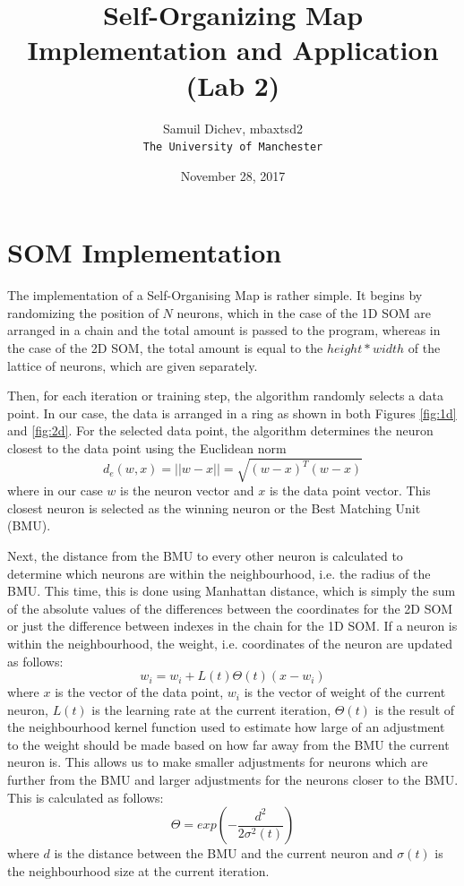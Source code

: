 \documentclass[a4paper,11pt,twocolumn]{article}
\title{Self-Organizing Map Implementation and Application (Lab 2)}
\date{November 28, 2017}
\author{
  Samuil Dichev, mbaxtsd2\\
  \texttt{The University of Manchester}\\
}
\begin{document}
\maketitle

\section{SOM Implementation}
The implementation of a Self-Organising Map is rather simple. It begins by randomizing the position of $N$ neurons, which in the case of the 1D SOM are arranged in a chain and the total amount is passed to the program, whereas in the case of the 2D SOM, the total amount is equal to the $height * width$ of the lattice of neurons, which are given separately.

Then, for each iteration or training step, the algorithm randomly selects a data point. In our case, the data is arranged in a ring as shown in both Figures \ref{fig:1d} and \ref{fig:2d}. For the selected data point, the algorithm determines the neuron closest to the data point using the Euclidean norm \[d_e(w,x) = ||w - x|| = \sqrt{(w - x)^T(w-x)}\] where in our case $w$ is the neuron vector and $x$ is the data point vector. This closest neuron is selected as the winning neuron or the Best Matching Unit (BMU). 

Next, the distance from the BMU to every other neuron is calculated to determine which neurons are within the neighbourhood, i.e. the radius of the BMU. This time, this is done using Manhattan distance, which is simply the sum of the absolute values of the differences between the coordinates for the 2D SOM or just the difference between indexes in the chain for the 1D SOM.
If a neuron is within the neighbourhood, the weight, i.e. coordinates of the neuron are updated as follows: \[w_i = w_i + L(t)\Theta(t)(x - w_i) \] where $x$ is the vector of the data point, $w_i$ is the vector of weight of the current neuron, $L(t)$ is the learning rate at the current iteration, $\Theta(t)$ is the result of the neighbourhood kernel function used to estimate how large of an adjustment to the weight should be made based on how far away from the BMU the current neuron is. This allows us to make smaller adjustments for neurons which are further from the BMU and larger adjustments for the neurons closer to the BMU. This is calculated as follows: \[\Theta = exp(-\frac{d^2}{2\sigma^2(t)}) \] where $d$ is the distance between the BMU and the current neuron and $\sigma(t)$ is the neighbourhood size at the current iteration. 
\end{document}
